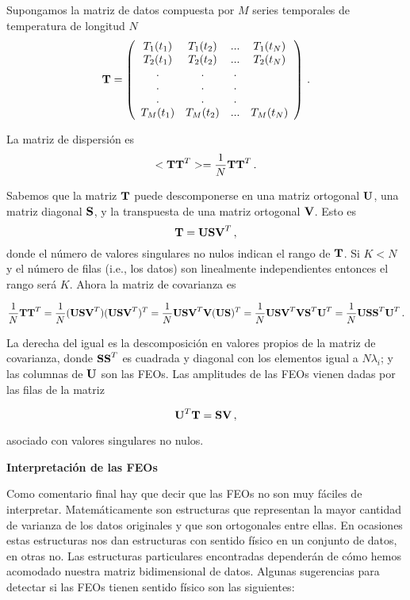 \documentclass[
]{agujournal2019}
\begin{document}
Supongamos la matriz de datos compuesta por \(M\) series temporales de
temperatura de longitud \(N\) \[{\textbf T}=\left(\begin{array}{cccc}
   T_{1}(t_1) & T_{1}(t_2) & ... & T_{1}(t_N)\\
   T_{2}(t_1) & T_{2}(t_2) & ... & T_{2}(t_N)\\
                . & . & . \\
        . & . & . \\
        . & . & . \\
   T_{M}(t_1) & T_{M}(t_2) & ... & T_{M}(t_N)\\
        \end{array}\right)\,.\]

La matriz de dispersión es
\[<{\textbf T}{\textbf T}^T>=\frac{1}{N} {\textbf T}{\textbf T}^T\,.\]

Sabemos que la matriz \({\textbf T}\) puede descomponerse en una matriz
ortogonal \({\textbf U}\), una matriz diagonal \({\textbf S}\), y la
transpuesta de una matriz ortogonal \({\textbf V}\). Esto es
\[{\textbf T}={\textbf U}{\textbf S}{\textbf V}^T\,,\] donde el número
de valores singulares no nulos indican el rango de \({\textbf T}\). Si
\(K<N\) y el número de filas (i.e., los datos) son linealmente
independientes entonces el rango será \(K\). Ahora la matriz de
covarianza es

\[\frac{1}{N} {\textbf T}{\textbf T}^T = \frac{1}{N} ({\textbf U}{\textbf S}{\textbf V}^T)({\textbf U}{\textbf S}{\textbf V}^T)^T=
\frac{1}{N}{\textbf U}{\textbf S}{\textbf V}^T{\textbf V}({\textbf U}{\textbf S})^T=\frac{1}{N} {\textbf U}{\textbf S}{\textbf V}^T{\textbf V}{\textbf S}^T{\textbf U}^T=\frac{1}{N} {\textbf U}{\textbf S}{\textbf S}^T{\textbf U}^T\,.\]

La derecha del igual es la descomposición en valores propios de la
matriz de covarianza, donde \({\textbf S}{\textbf S}^T\) es cuadrada y
diagonal con los elementos igual a \(N\lambda_i\); y las columnas de
\({\textbf U}\) son las FEOs. Las amplitudes de las FEOs vienen dadas
por las filas de la matriz

\[{\textbf U}^T{\textbf T}={\textbf S}{\textbf V}\,,\]

asociado con valores singulares no nulos.

\vspace{0.25cm}

\textbf{Interpretación de las FEOs}

Como comentario final hay que decir que las FEOs no son muy fáciles de
interpretar. Matemáticamente son estructuras que representan la mayor
cantidad de varianza de los datos originales y que son ortogonales entre
ellas. En ocasiones estas estructuras nos dan estructuras con sentido
físico en un conjunto de datos, en otras no. Las estructuras
particulares encontradas dependerán de cómo hemos acomodado nuestra
matriz bidimensional de datos. Algunas sugerencias para detectar si las
FEOs tienen sentido físico son las siguientes:\\
\end{document}
